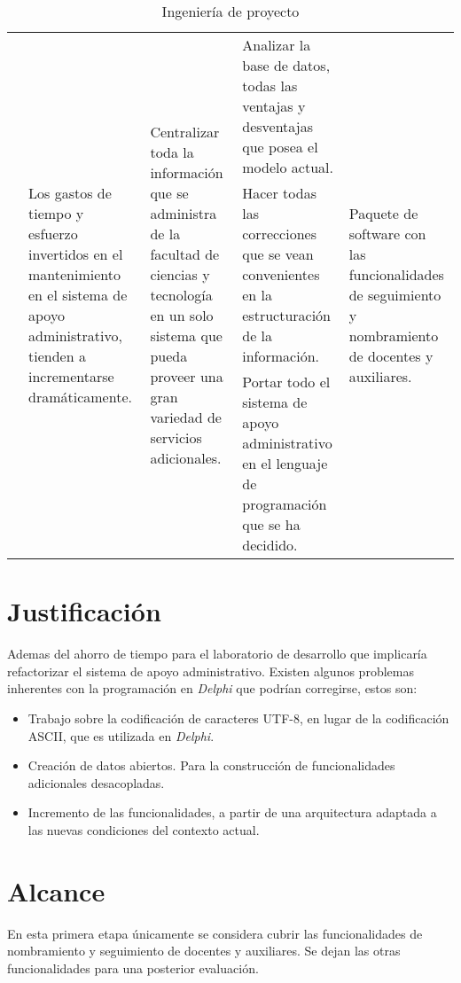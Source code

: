 \documentclass[letterpaper,11pt]{article}
\begin{document}
\begin{sidewaystable}
\begin{tabular}{|l|l|l|p{6.5cm}|l|}
\cline{2-5}
& \multirow{3}{3cm}{Los gastos de tiempo y esfuerzo invertidos en el
mantenimiento en el sistema de apoyo administrativo, tienden a incrementarse dramáticamente. } &
\multirow{3}{3.5cm}{Centralizar toda la información que se administra de la
facultad de ciencias y tecnología en un solo sistema que pueda proveer una gran
variedad de servicios adicionales.} &
Analizar la base de datos, todas las ventajas y desventajas que posea el modelo
actual. &
\multirow{3}{2.5cm}{Paquete de software con las funcionalidades de seguimiento
y nombramiento de docentes y auxiliares.} \\
\cline{4-4}
& & & Hacer todas las correcciones que se vean convenientes en la
estructuración de la información. & \\
\cline{4-4}
& & & Portar todo el sistema de apoyo administrativo en el lenguaje de
programación que se ha decidido. & \\
\hline
\end{tabular}
\caption{Ingeniería de proyecto}
\label{ingenieriadeproyecto}
\end{sidewaystable}

\section{Justificación}
Ademas del ahorro de tiempo para el laboratorio de desarrollo que implicaría
refactorizar el sistema de apoyo administrativo. Existen algunos problemas
inherentes con la programación en \emph{Delphi} que podrían corregirse, estos
son:

\begin{itemize}
\item Trabajo sobre la codificación de caracteres UTF-8, en lugar de la
      codificación ASCII, que es utilizada en \emph{Delphi}.
\item Creación de datos abiertos. Para la construcción de funcionalidades
      adicionales desacopladas.
\item Incremento de las funcionalidades, a partir de una arquitectura adaptada
      a las nuevas condiciones del contexto actual.
\end{itemize}

\section{Alcance}

En esta primera etapa únicamente se considera cubrir las funcionalidades de
nombramiento y seguimiento de docentes y auxiliares. Se dejan las otras
funcionalidades para una posterior evaluación.
\end{document}
